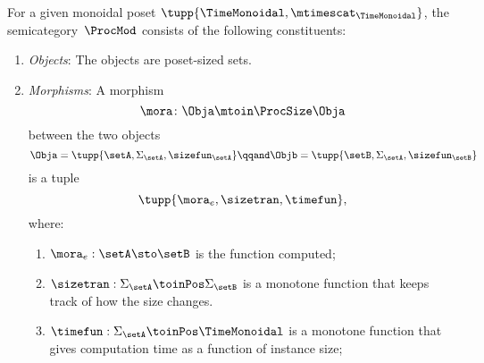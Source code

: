 \begin{definition}
    \label{def:ProcMod}
    For a given monoidal poset $\tupp{\TimeMonoidal, \mtimescat_{\TimeMonoidal}}$, the semicategory~$\ProcMod$ consists of the following constituents:
    \begin{enumerate}
        \item \emph{Objects}: The objects are poset-sized sets.
        \item \emph{Morphisms}: A morphism
        \begin{equation}
            \mora \colon \Obja \mtoin\ProcSize \Obja
        \end{equation}
        between the two objects
        \begin{equation}
            \Obja = \tupp{\setA, \Sigma_{\setA}, \sizefun_{\setA}}
            \qqand
            \Objb = \tupp{\setB, \Sigma_{\setA}, \sizefun_{\setB}}
        \end{equation}
        is a tuple
        \begin{equation}
            \tupp{\mora_e, \sizetran, \timefun },
        \end{equation}
        where:
        \begin{enumerate}
            \item $\mora_e : \setA \sto \setB$ is the function computed;
            \item $\sizetran: \Sigma_{\setA} \toinPos \Sigma_{\setB}$ is a monotone function that keeps track of how the size changes.
            \item $\timefun: \Sigma_{\setA} \toinPos \TimeMonoidal$ is a monotone function that gives computation time as a function of instance size;
        \end{enumerate}


\end{enumerate}
\end{definition}

